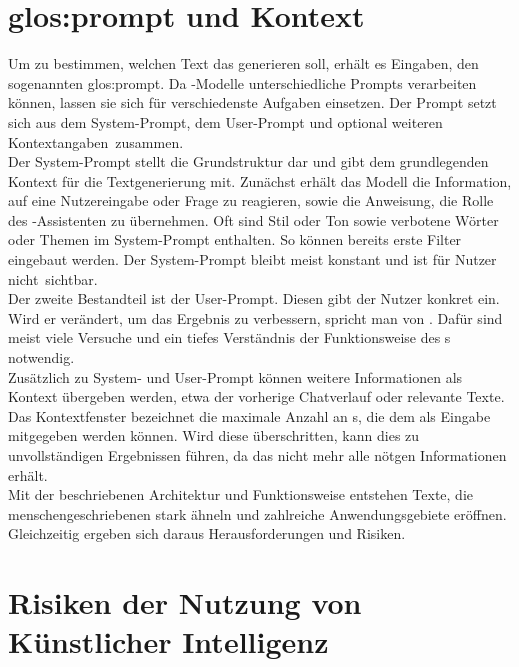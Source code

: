 \documentclass[../main.tex]{subfiles}
\begin{document}
\section{\gls{glos:prompt} und Kontext}

Um zu bestimmen, welchen Text das  generieren soll, erhält es Eingaben, den sogenannten \gls{glos:prompt}. Da -Modelle unterschiedliche Prompts 
verarbeiten können, lassen sie sich für verschiedenste Aufgaben einsetzen. Der Prompt setzt sich aus dem System-Prompt, dem User-Prompt und optional weiteren \mbox{Kontextangaben zusammen. \cite{systemprompt}}\\
Der System-Prompt stellt die Grundstruktur dar und gibt dem  grundlegenden Kontext für die Textgenerierung mit. Zunächst erhält das Modell die Information, auf eine 
Nutzereingabe oder Frage zu reagieren, sowie die Anweisung, die Rolle des -Assistenten zu übernehmen. Oft sind Stil oder Ton sowie verbotene Wörter oder Themen im System-Prompt 
enthalten. So können bereits erste Filter eingebaut werden. \cite{systemprompt} Der System-Prompt bleibt meist konstant und ist für Nutzer \mbox{nicht sichtbar.}\\
Der zweite Bestandteil ist der User-Prompt. Diesen gibt der Nutzer konkret ein. Wird er verändert, um das Ergebnis zu verbessern, spricht man von  . 
Dafür sind meist viele Versuche und ein tiefes Verständnis der Funktionsweise des s notwendig. \cite{promptengineering}\\
Zusätzlich zu System- und User-Prompt können weitere Informationen als Kontext übergeben werden, etwa der vorherige Chatverlauf oder relevante Texte. 
Das Kontextfenster bezeichnet die maximale Anzahl an s, die dem  als Eingabe mitgegeben werden können. Wird diese überschritten, kann dies zu unvollständigen 
Ergebnissen führen, da das  nicht mehr alle nötgen Informationen erhält.\\
Mit der beschriebenen Architektur und Funktionsweise entstehen Texte, die menschengeschriebenen stark ähneln und zahlreiche Anwendungsgebiete eröffnen. Gleichzeitig ergeben sich daraus Herausforderungen und Risiken.

\section{Risiken der Nutzung von Künstlicher Intelligenz}
\end{document}
